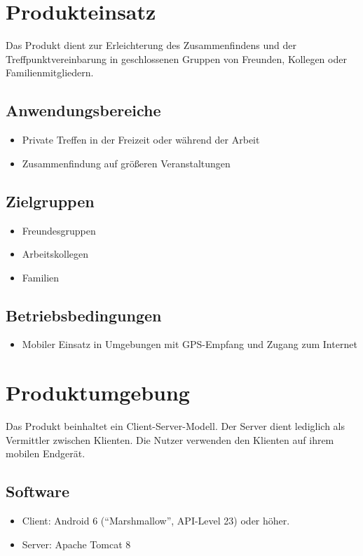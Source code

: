 \documentclass[parskip=full,11pt]{scrartcl}
\begin{document}
\pagebreak
\section{Produkteinsatz}
Das Produkt dient zur Erleichterung des Zusammenfindens und der
Treffpunktvereinbarung in geschlossenen Gruppen von Freunden, Kollegen oder
Familienmitgliedern.

\subsection{Anwendungsbereiche}
\begin{itemize}
    \item Private Treffen in der Freizeit oder während der Arbeit
    \item Zusammenfindung auf größeren Veranstaltungen
\end{itemize}

\subsection{Zielgruppen}
\begin{itemize}
    \item Freundesgruppen
    \item Arbeitskollegen
    \item Familien
\end{itemize}

\subsection{Betriebsbedingungen}
\begin{itemize}
    \item Mobiler Einsatz in Umgebungen mit GPS-Empfang und Zugang zum Internet
\end{itemize}

\pagebreak
\section{Produktumgebung}
Das Produkt beinhaltet ein Client-Server-Modell.
Der Server dient lediglich als Vermittler zwischen Klienten.
Die Nutzer verwenden den Klienten auf ihrem mobilen Endgerät.
\subsection{Software}
\begin{itemize}
    \item Client: Android 6 (\enquote{Marshmallow}, API-Level 23) oder
        höher.
    \item Server: Apache Tomcat 8
\end{itemize}
\end{document}
